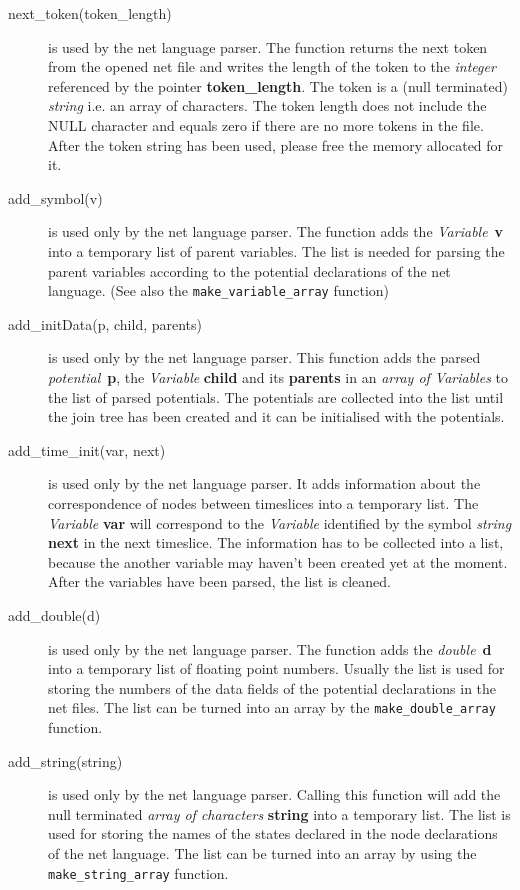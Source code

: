 \documentclass[12pt,a4paper]{report}
\newcommand{\cdatatype}[1]{{\it #1}}
\newcommand{\cparameter}[1]{\textbf{#1}}
\newcommand{\cfunction}[1]{\texttt{#1}}
\begin{document}
\begin{description}
\item[next\_token(token\_length)] is used by the net language
parser. The function returns the next token from the opened net file
and writes the length of the token to the \cdatatype{integer} referenced by
the pointer \cparameter{token\_length}. The token is a (null terminated)
\cdatatype{string} i.e. an array of characters. The token length does not
include the NULL character and equals zero if there are no more tokens
in the file. After the token string has been used, please free the
memory allocated for it.

\item[add\_symbol(v)] is used only by the net language parser. The
function adds the \cdatatype{Variable}~\cparameter{v} into a temporary 
list of parent variables. The list is needed for parsing the parent 
variables according to the potential declarations of the net
language. (See also the \cfunction{make\_variable\_array} function)

\item[add\_initData(p, child, parents)] is used only by the net
language parser. This function adds the parsed 
\cdatatype{potential}~\cparameter{p}, the \cdatatype{Variable} 
\cparameter{child} and its \cparameter{parents} in an 
\cdatatype{array of Variables} to the list of parsed potentials. 
The potentials are collected into the list until the join tree has
been created and it can be initialised with the potentials.

\item[add\_time\_init(var, next)] is used only by the net language
parser. It adds information about the correspondence of nodes between
timeslices into a temporary list. The \cdatatype{Variable}
\cparameter{var} will correspond to the \cdatatype{Variable}
identified by the symbol \cdatatype{string} \cparameter{next} in the 
next timeslice. The information has to be collected into a list,
because the another variable may haven't been created yet at the
moment. After the variables have been parsed, the list is cleaned.

\item[add\_double(d)] is used only by the net language parser. The
function adds the \cdatatype{double}~\cparameter{d} into a temporary list of
floating point numbers. Usually the list is used for storing the
numbers of the data fields of the potential declarations in the net
files. The list can be turned into an array by the
\cfunction{make\_double\_array} function.

\item[add\_string(string)] is used only by the net language
parser. Calling this function will add the null terminated \cdatatype{array
of characters} \cparameter{string} into a temporary list. The list is used
for storing the names of the states declared in the node declarations
of the net language. The list can be turned into an array by using the
\cfunction{make\_string\_array} function.


\end{description}
\end{document}

